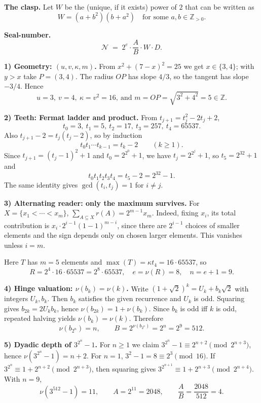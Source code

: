 \smallskip
\noindent\textbf{The clasp.}
Let \(W\) be the (unique, if it exists) power of \(2\) that can be written as
\[
W=(a+b^2)(b+a^2)\quad\text{for some }a,b\in\mathbb Z_{>0}.
\]

\smallskip
\noindent\textbf{Seal-number.}
\[
\mathcal N \;=\; 2^{e}\cdot \frac{A}{B}\cdot W\cdot D.
\]

\smallskip
\endgroup


\SolutionPage
\scriptsize
\textbf{1) Geometry: \((u,v,\kappa,m)\).}
From \(x^2+(7-x)^2=25\) we get \(x\in\{3,4\}\); with \(y>x\) take \(P=(3,4)\).
The radius \(OP\) has slope \(4/3\), so the tangent has slope \(-3/4\). Hence
\[
u=3,\ v=4,\ \kappa=v^2=16,\ \text{and }m=OP=\sqrt{3^2+4^2}=5\in\mathbb Z.
\]


\textbf{2) Teeth: Fermat ladder and product.}
From \(t_{j+1}=t_j^2-2t_j+2\),
\[
t_0=3,\ t_1=5,\ t_2=17,\ t_3=257,\ t_4=65537.
\]
Also \(t_{j+1}-2=t_j(t_j-2)\), so by induction
\[
t_0t_1\cdots t_{k-1}=t_k-2\qquad(k\ge 1).
\]
Since \(t_{j+1}=(t_j-1)^2+1\) and \(t_0=2^{2^0}+1\), we have \(t_j=2^{2^j}+1\), so \(t_5=2^{32}+1\) and
\[
t_0t_1t_2t_3t_4=t_5-2=2^{32}-1.
\]
The same identity gives \(\gcd(t_i,t_j)=1\) for \(i\ne j\).


\textbf{3) Alternating reader: only the maximum survives.}
For \(X=\{x_1<\cdots<x_m\}\),
$
\sum_{A\subseteq X} r(A)=2^{m-1}x_m.
$
Indeed, fixing \(x_i\), its total contribution is \(x_i\cdot 2^{i-1}(1-1)^{m-i}\), since there are \(2^{i-1}\) choices of smaller elements and the sign depends only on chosen larger elements. This vanishes unless \(i=m\).

Here \(T\) has \(m=5\) elements and \(\max(T)=\kappa t_4=16\cdot 65537\), so
\[
R=2^{4}\cdot 16\cdot 65537=2^{8}\cdot 65537,\quad e=\nu(R)=8,\quad n=e+1=9.
\]


\textbf{4) Hinge valuation: \(\nu(b_k)=\nu(k)\).}
Write \((1+\sqrt2)^k=U_k+b_k\sqrt2\) with integers \(U_k,b_k\). Then \(b_k\) satisfies the given recurrence and \(U_k\) is odd.
Squaring gives \(b_{2k}=2U_kb_k\), hence \(\nu(b_{2k})=1+\nu(b_k)\). Since \(b_k\) is odd iff \(k\) is odd, repeated halving yields \(\nu(b_k)=\nu(k)\). Therefore
\[
\nu(b_{2^n})=n,\qquad B=2^{\nu(b_{2^n})}=2^n=2^9=512.
\]


\textbf{5) Dyadic depth of \(3^{2^n}-1\).}
For \(n\ge 1\) we claim \(3^{2^n}-1\equiv 2^{n+2}\pmod{2^{n+3}}\), hence \(\nu(3^{2^n}-1)=n+2\). For \(n=1\), \(3^2-1=8\equiv 2^3\pmod{16}\). If \(3^{2^n}\equiv 1+2^{n+2}\pmod{2^{n+3}}\), then squaring gives \(3^{2^{n+1}}\equiv 1+2^{n+3}\pmod{2^{n+4}}\).
With \(n=9\),
\[
\nu(3^{512}-1)=11,\qquad A=2^{11}=2048,\qquad \frac{A}{B}=\frac{2048}{512}=4.
\]


